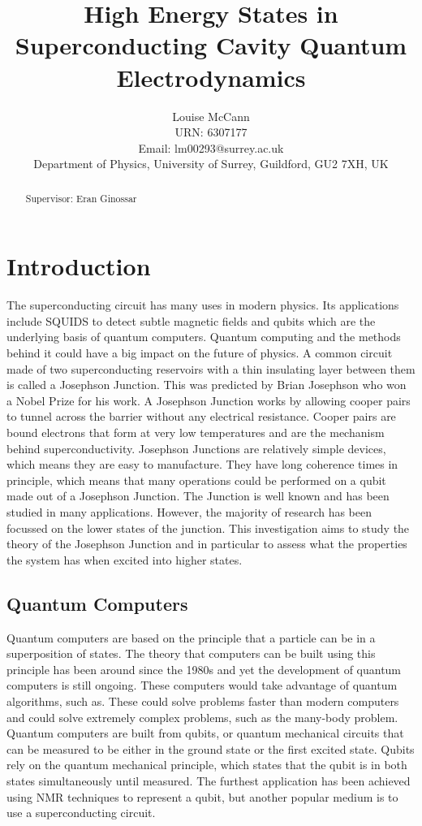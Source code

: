 \documentclass[11pt]{article}
\title{High Energy States in Superconducting Cavity Quantum Electrodynamics}
\author{Louise McCann \\ URN: 6307177 \\ Email: lm00293@surrey.ac.uk \\ Department of Physics, University of Surrey, Guildford, GU2 7XH, UK}
\begin{document}
    \maketitle

    \begin{abstract}
    Supervisor: Eran Ginossar
    \end{abstract}

    \clearpage

    \section{Introduction}
The superconducting circuit has many uses in modern physics. Its applications include SQUIDS to detect subtle magnetic fields and qubits which are the underlying basis of quantum computers. Quantum computing and the methods behind it could have a big impact on the future of physics. A common circuit made of two superconducting reservoirs with a thin insulating layer between them is called a Josephson Junction. This was predicted by Brian Josephson who won a Nobel Prize for his work. A Josephson Junction works by allowing cooper pairs to tunnel across the barrier without any electrical resistance. Cooper pairs are bound electrons that form at very low temperatures and are the mechanism behind superconductivity. Josephson Junctions are relatively simple devices, which means they are easy to manufacture. They have long coherence times in principle, which means that many operations could be performed on a qubit made out of a Josephson Junction. The Junction is well known and has been studied in many applications. However, the majority of research has been focussed on the lower states of the junction. This investigation aims to study the theory of the Josephson Junction and in particular to assess what the properties the system has when excited into higher states.

  \subsection{Quantum Computers}
  Quantum computers are based on the principle that a particle can be in a superposition of states. The theory that computers can be built using this principle has been around since the 1980s and yet the development of quantum computers is still ongoing. These computers would take advantage of quantum algorithms, such as. These could solve problems faster than modern computers and could solve extremely complex problems, such as the many-body problem. Quantum computers are built from qubits, or quantum mechanical circuits that can be measured to be either in the ground state or the first excited state. Qubits rely on the quantum mechanical principle, which states that the qubit is in both states simultaneously until measured. The furthest application has been achieved using NMR techniques to represent a qubit, but another popular medium is to use a superconducting circuit.
\end{document}
